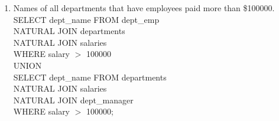 \documentclass{article}
\begin{document}
\begin{enumerate}
	\item Names of all departments that have employees paid more than \$100000.\\

	SELECT dept\_name FROM dept\_emp\\
	NATURAL JOIN departments \\
	NATURAL JOIN salaries\\
	WHERE salary $>$ 100000\\
	UNION\\
	SELECT dept\_name FROM departments \\
	NATURAL JOIN salaries \\
	NATURAL JOIN dept\_manager\\
	WHERE salary $>$ 100000;\\
	
\end{enumerate}
\end{document}
